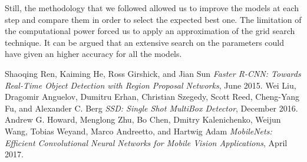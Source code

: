 \documentclass[10pt,conference,compsocconf]{IEEEtran}
\begin{document}
Still, the methodology that we followed allowed us to improve the models at each step and compare them in order to select the expected best one. The limitation of the computational power forced us to apply an approximation of the grid search technique. It can be argued that an extensive search on the parameters could have given an higher accuracy for all the models.


\begin{thebibliography}{1}
\label{reference0}
Shaoqing Ren, Kaiming He, Ross Girshick, and Jian Sun \emph{Faster R-CNN: Towards Real-Time Object
Detection with Region Proposal Networks}, June 2015.
\vspace*{-0.8\baselineskip}
\label{reference1}
Wei Liu, Dragomir Anguelov, Dumitru Erhan, Christian Szegedy, Scott Reed, Cheng-Yang Fu, and Alexander C. Berg \emph{SSD: Single Shot MultiBox Detector}, December 2016.
\vspace*{-0.8\baselineskip}
\label{reference2}
Andrew G. Howard, Menglong Zhu, Bo Chen, Dmitry Kalenichenko, Weijun Wang, Tobias Weyand, Marco Andreetto, and Hartwig Adam \emph{MobileNets: Efficient Convolutional Neural Networks for Mobile Vision Applications}, April 2017.
\end{thebibliography}
\end{document}
